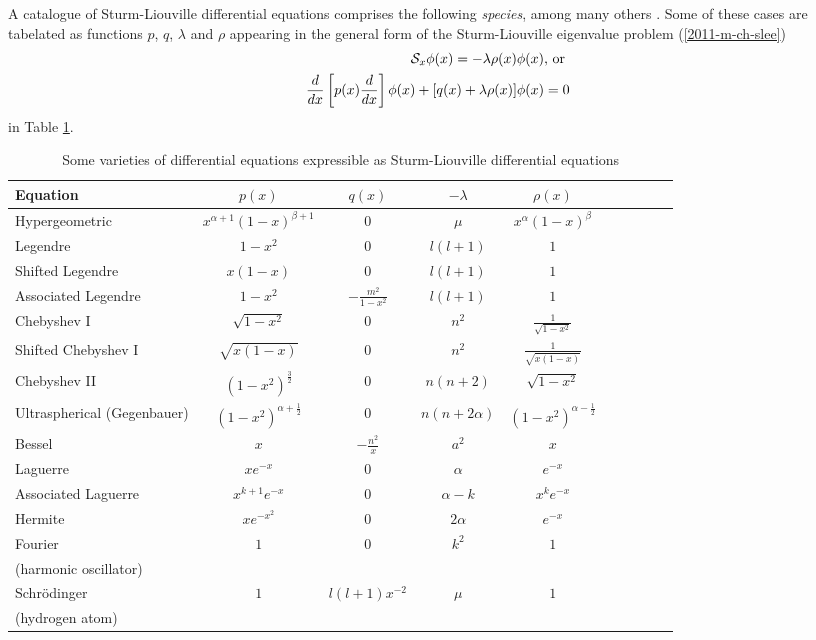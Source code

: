 A catalogue of Sturm-Liouville differential equations
comprises the following {\it species}, among many others \cite[-15mm]{arfken05,Al-Gwaiz,everitt-handbook-sl}.
Some of these cases are
tabelated as functions   $p$, $q$, $\lambda$ and $\rho$ appearing in the general form
of the Sturm-Liouville eigenvalue problem  (\ref{2011-m-ch-slee})
\begin{equation}
\begin{split}
{\cal S}_{x}    \phi (x) = -\lambda \rho  (x) \phi (x)\textrm{, or } \\
\frac{d}{dx}
\left[
p(x)
\frac{d}{dx}
\right] \phi(x)
+
[q(x)  +   \lambda \rho  (x) ]\phi(x)=0
\end{split}
\end{equation}
in Table \ref{2011-m-sl-t-varieties}.
\begin{table}
{\footnotesize
\begin{tabular}{lccccccccc}
\hline\hline
Equation & $ p(x)$ & $q(x)$ & $-\lambda$ & $\rho (x)$\\
\hline
Hypergeometric  & $x^{\alpha+1}(1-x)^{\beta +1} $ &   $0$ &  $ \mu $ &  $x^{\alpha}(1-x)^{\beta }$
\\
Legendre  & $1-x^2 $ &   $0$ &  $l(l+1) $ &  $1$
\\
Shifted Legendre    & $ x(1-x)$ &   $0$ &  $l(l+1) $ &  $1$
\\
Associated Legendre    & $1-x^2 $ &   $-\frac{m^2}{1-x^2}$ &  $l(l+1) $ &  $1$
\\
Chebyshev I   & $\sqrt{1-x^2} $ &   $0$ &  $n^2 $ &  $ \frac{1}{\sqrt{1-x^2}}$
\\
Shifted Chebyshev I   & $\sqrt{x(1-x)} $ &   $0$ &  $n^2 $ &  $ \frac{1}{\sqrt{x(1-x)}}$
\\
Chebyshev II   & $(1-x^2)^\frac{3}{2} $ &   $0$ &  $n(n+2) $ &  $  \sqrt{1-x^2} $
\\
Ultraspherical (Gegenbauer)   & $(1-x^2)^{\alpha + \frac{1}{2}} $ &   $0$ &  $n(n+2\alpha ) $ &  $  (1-x^2)^{\alpha - \frac{1}{2}}$
\\
Bessel   & $ x$ &   $-\frac{n^2}{x}$ &  $a^2 $ &  $ x$
\\
Laguerre   & $x e^{-x} $ &   $0$ &  $\alpha $ &  $e^{-x} $
\\
Associated Laguerre     & $x^{k+1} e^{-x} $ &   $0$ &  $\alpha -k$ &  $x^ke^{-x} $
\\
Hermite     & $x e^{-x^2} $ &   $0$ &  $2\alpha $ &  $e^{-x} $
\\
Fourier    & $1 $ &   $0$ &  $ k^2 $ &  $1$
\\
(harmonic oscillator)    &   &     &  $  $ &  $ $  \\
Schr\"odinger    & $1 $ &   $l(l+1)x^{-2}$ &  $ \mu $ &  $1$
\\
(hydrogen atom)    &   &     &  $  $ &  $ $  \\
\hline\hline
\end{tabular}
}
\caption{Some varieties of differential equations expressible as Sturm-Liouville differential equations}
\label{2011-m-sl-t-varieties}
\end{table}

